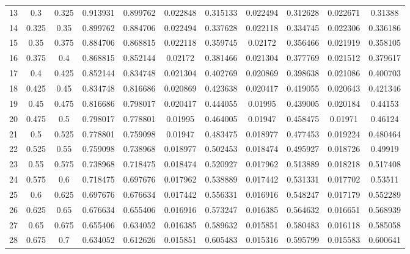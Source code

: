 \documentclass[11pt]{article}
\begin{document}
\begin{table}[H]
{\begin{tabular}{c c c c c c c c c c c}
                13 & 0.3 & 0.325 & 0.913931 & 0.899762 & 0.022848 & 0.315133 & 0.022494 & 0.312628 & 0.022671 & 0.31388 \\
                14 & 0.325 & 0.35 & 0.899762 & 0.884706 & 0.022494 & 0.337628 & 0.022118 & 0.334745 & 0.022306 & 0.336186 \\
                15 & 0.35 & 0.375 & 0.884706 & 0.868815 & 0.022118 & 0.359745 & 0.02172 & 0.356466 & 0.021919 & 0.358105 \\
                16 & 0.375 & 0.4 & 0.868815 & 0.852144 & 0.02172 & 0.381466 & 0.021304 & 0.377769 & 0.021512 & 0.379617 \\
                17 & 0.4 & 0.425 & 0.852144 & 0.834748 & 0.021304 & 0.402769 & 0.020869 & 0.398638 & 0.021086 & 0.400703 \\
                18 & 0.425 & 0.45 & 0.834748 & 0.816686 & 0.020869 & 0.423638 & 0.020417 & 0.419055 & 0.020643 & 0.421346 \\
                19 & 0.45 & 0.475 & 0.816686 & 0.798017 & 0.020417 & 0.444055 & 0.01995 & 0.439005 & 0.020184 & 0.44153 \\
                20 & 0.475 & 0.5 & 0.798017 & 0.778801 & 0.01995 & 0.464005 & 0.01947 & 0.458475 & 0.01971 & 0.46124 \\
                21 & 0.5 & 0.525 & 0.778801 & 0.759098 & 0.01947 & 0.483475 & 0.018977 & 0.477453 & 0.019224 & 0.480464 \\
                22 & 0.525 & 0.55 & 0.759098 & 0.738968 & 0.018977 & 0.502453 & 0.018474 & 0.495927 & 0.018726 & 0.49919 \\
                23 & 0.55 & 0.575 & 0.738968 & 0.718475 & 0.018474 & 0.520927 & 0.017962 & 0.513889 & 0.018218 & 0.517408 \\
                24 & 0.575 & 0.6 & 0.718475 & 0.697676 & 0.017962 & 0.538889 & 0.017442 & 0.531331 & 0.017702 & 0.53511 \\
                25 & 0.6 & 0.625 & 0.697676 & 0.676634 & 0.017442 & 0.556331 & 0.016916 & 0.548247 & 0.017179 & 0.552289 \\
                26 & 0.625 & 0.65 & 0.676634 & 0.655406 & 0.016916 & 0.573247 & 0.016385 & 0.564632 & 0.016651 & 0.568939 \\
                27 & 0.65 & 0.675 & 0.655406 & 0.634052 & 0.016385 & 0.589632 & 0.015851 & 0.580483 & 0.016118 & 0.585058 \\
                28 & 0.675 & 0.7 & 0.634052 & 0.612626 & 0.015851 & 0.605483 & 0.015316 & 0.595799 & 0.015583 & 0.600641 \\

\end{tabular}}
\end{table}
\end{document}
